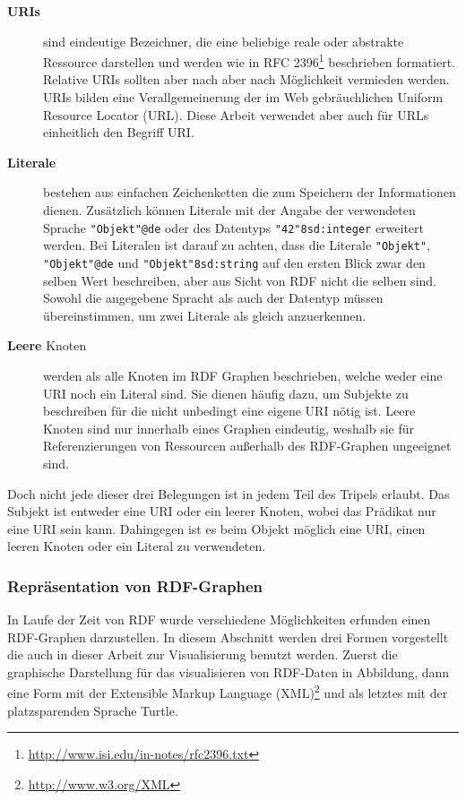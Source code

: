 \begin{description}
    \item[\textbf{URIs}] sind eindeutige Bezeichner, die eine beliebige reale oder abstrakte Ressource darstellen und werden wie in RFC 2396\footnote{\url{http://www.isi.edu/in-notes/rfc2396.txt}} beschrieben formatiert. Relative URIs sollten aber nach \cite{Klyne2004} aber nach Möglichkeit vermieden werden. URIs bilden eine Verallgemeinerung der im Web gebräuchlichen Uniform Resource Locator (URL). Diese Arbeit verwendet aber auch für URLs einheitlich den Begriff URI.
   
    \item[\textbf{Literale}] bestehen aus einfachen Zeichenketten die zum Speichern der Informationen dienen. Zusätzlich können Literale mit der Angabe der verwendeten Sprache \texttt{"Objekt"@de} oder des Datentyps \texttt{"42"^^xsd:integer} erweitert werden. Bei Literalen ist darauf zu achten, dass die Literale \texttt{"Objekt"}, \texttt{"Objekt"@de} und \texttt{"Objekt"^^xsd:string} auf den ersten Blick zwar den selben Wert beschreiben, aber aus Sicht von RDF nicht die selben sind. Sowohl die angegebene Spracht als auch der Datentyp müssen übereinstimmen, um zwei Literale als gleich anzuerkennen.

    \item[\textbf{Leere} Knoten] werden als alle Knoten im RDF Graphen beschrieben, welche weder eine URI noch ein Literal sind. Sie dienen häufig dazu, um Subjekte zu beschreiben für die nicht unbedingt eine eigene URI nötig ist. Leere Knoten sind nur innerhalb eines Graphen eindeutig, weshalb sie für Referenzierungen von Ressourcen außerhalb des RDF-Graphen ungeeignet sind.
\end{description}

Doch nicht jede dieser drei Belegungen ist in jedem Teil des Tripels erlaubt. Das Subjekt ist entweder eine URI oder ein leerer Knoten, wobei das Prädikat nur eine URI sein kann. Dahingegen ist es beim Objekt möglich eine URI, einen leeren Knoten oder ein Literal zu verwendeten. 


\subsubsection{Repräsentation von RDF-Graphen} %
\label{ssub:darstellung_von_rdf_graphen}

In Laufe der Zeit von RDF wurde verschiedene Möglichkeiten erfunden einen RDF-Graphen darzustellen. In diesem Abschnitt werden drei Formen vorgestellt die auch in dieser Arbeit zur Visualisierung benutzt werden. Zuerst die graphische Darstellung für das visualisieren von RDF-Daten in Abbildung, dann eine Form mit der Extensible Markup Language (XML)\footnote{\url{http://www.w3.org/XML}} und als letztes mit der platzsparenden Sprache Turtle.


